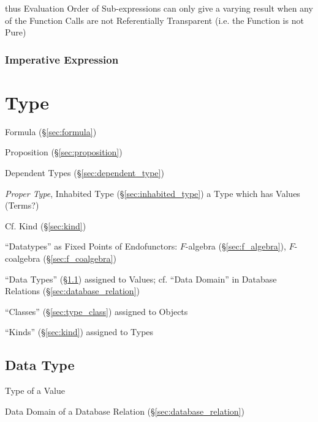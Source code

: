 thus Evaluation Order of Sub-expressions can only give a varying
result when any of the Function Calls are not Referentially
Transparent (i.e. the Function is not Pure)




\subsubsection{Imperative Expression}\label{sec:imperative_expression}




\section{Type}\label{sec:type}

Formula (\S\ref{sec:formula})

Proposition (\S\ref{sec:proposition})


Dependent Types (\S\ref{sec:dependent_type})

\emph{Proper Type}, Inhabited Type (\S\ref{sec:inhabited_type}) a Type
which has Values (Terms?)

\fist Cf. Kind (\S\ref{sec:kind})


``Datatypes'' as Fixed Points of Endofunctors: $F$-algebra
(\S\ref{sec:f_algebra}), $F$-coalgebra (\S\ref{sec:f_coalgebra})

``Data Types'' (\S\ref{sec:datatype}) assigned to Values; cf. ``Data Domain''
in Database Relations (\S\ref{sec:database_relation})

``Classes'' (\S\ref{sec:type_class}) assigned to Objects

``Kinds'' (\S\ref{sec:kind}) assigned to Types



\subsection{Data Type}\label{sec:datatype}

Type of a Value

\fist Data Domain of a Database Relation (\S\ref{sec:database_relation})



